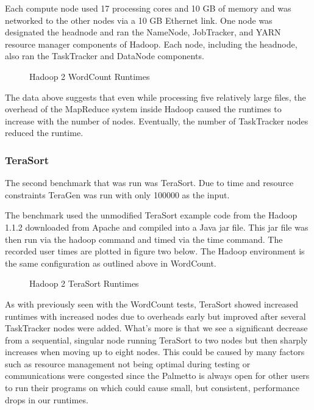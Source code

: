 \documentclass[conference]{IEEEtran}
\begin{document}
		Each compute node used 17 processing cores and 10 GB of memory and was networked to the other nodes via a 10 GB Ethernet link. One node was designated the headnode and ran the NameNode, JobTracker, and YARN resource manager components of Hadoop. Each node, including the headnode, also ran the TaskTracker and DataNode components.

                  				\begin{figure}[h]
                    					\begin{center}
                        						
                        						\caption{Hadoop 2 WordCount Runtimes}
                    					\end{center}
                  				\end{figure}
		
		The data above suggests that even while processing five relatively large files, the overhead of the MapReduce system inside Hadoop caused the runtimes to increase with the number of nodes. Eventually, the number of TaskTracker nodes reduced the runtime.


				\subsubsection{TeraSort}
					The second benchmark that was run was TeraSort. Due to time and resource constraints TeraGen was run with only 100000 as the input.

					The benchmark used the unmodified TeraSort example code from the Hadoop 1.1.2 downloaded from Apache and compiled into a Java jar file. This jar file was then run via the hadoop command and timed via the time command. The recorded user times are plotted in figure two below. The Hadoop environment is the same configuration as outlined above in WordCount.
					\begin{figure}[h]
                   				\begin{center}
                       					
                        					\caption{Hadoop 2 TeraSort Runtimes}
                    				\end{center}
                  			\end{figure}

					As with previously seen with the WordCount tests, TeraSort showed increased runtimes with increased nodes due to overheads early but improved after several TaskTracker nodes were added. What’s more is that we see a significant decrease from a sequential, singular node running TeraSort to two nodes but then sharply increases when moving up to eight nodes. This could be caused by many factors such as resource management not being optimal during testing or communications were congested since the Palmetto is always open for other users to run their programs on which could cause small, but consistent, performance drops in our runtimes.
\end{document}
